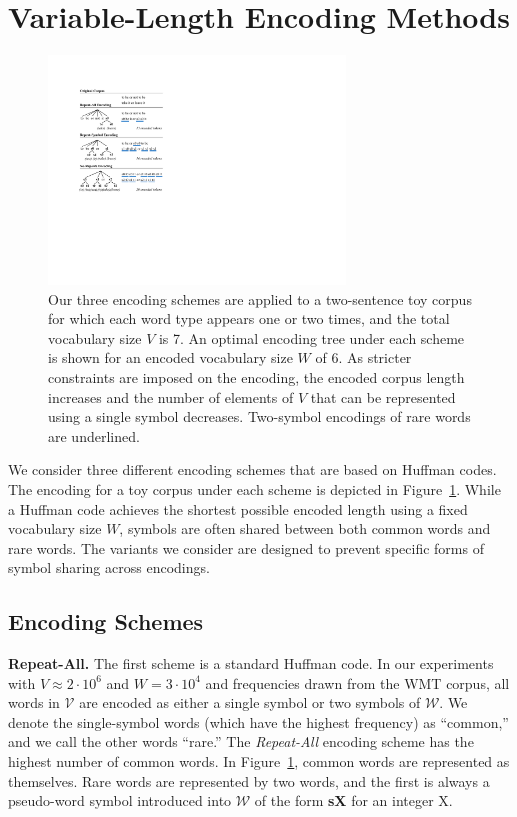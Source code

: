 \section{Variable-Length Encoding Methods}
\label{sec:encoding}

\begin{figure}[t]
\includegraphics[width=3.1in]{images/examples}
\caption{Our three encoding schemes are applied to a two-sentence toy corpus
for which each word type appears one or two times, and the total vocabulary
size $V$ is 7. An optimal encoding tree under each scheme is shown for an
encoded vocabulary size $W$ of 6. As stricter constraints are imposed on the
encoding, the encoded corpus length increases and the number of elements of $V$
that can be represented using a single symbol decreases. Two-symbol encodings
of rare words are underlined.}
\label{fig:examples}
\end{figure}

We consider three different encoding schemes that are based on Huffman codes.
The encoding for a toy corpus under each scheme is depicted in
Figure~\ref{fig:examples}. While a Huffman code achieves the shortest possible
encoded length using a fixed vocabulary size $W$, symbols are often shared
between both common words and rare words. The variants we
consider are designed to prevent specific forms of symbol sharing across encodings.

\subsection{Encoding Schemes}

\noindent\textbf{Repeat-All.}
The first scheme is a standard Huffman code. In our experiments with
$V\approx2\cdot10^6$ and $W=3\cdot10^4$ and frequencies drawn from the WMT
corpus, all words in $\mathcal{V}$ are encoded as either a single symbol or two
symbols of $\mathcal{W}$. We denote the single-symbol words (which have the
highest frequency) as ``common,'' and we call the other words ``rare.'' The
\emph{Repeat-All} encoding scheme has the highest number of common words. In
Figure~\ref{fig:examples}, common words are represented as themselves. Rare
words are represented by two words, and the first is always a pseudo-word
symbol introduced into $\mathcal{W}$ of the form \textbf{sX} for an integer X.

